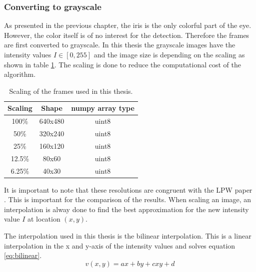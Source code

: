 \subsubsection{Converting to grayscale}
As presented in the previous chapter, the iris is the only colorful part of the eye. However, the color itself is of no interest for the detection. Therefore the frames are first converted to grayscale. 
In this thesis the grayscale images have the intensity values $I \in [0,255]$ and the image size is depending on the scaling as shown in table \ref{tab:resoluiton}. The scaling is done to reduce the computational cost of the algorithm. 

\begin{table}[h]
    \centering 
    \begin{minipage}{0.7\textwidth}
      \centering
      \begin{tabular}{|c|c|c|}
        \hline
        Scaling &  Shape & numpy array type \\
        \hline
        100\% & 640x480& uint8 \\
        50\% & 320x240 & uint8 \\
        25\% & 160x120 & uint8 \\
        12.5\% & 80x60 & uint8 \\
        6.25\% & 40x30 & uint8 \\
        \hline
      \end{tabular}
      \caption{Scaling of the frames used in this thesis.}
      \label{tab:resoluiton}
    \end{minipage}\hfill
\end{table}

It is important to note that these resolutions are congruent with the LPW paper \cite{zhang_max-planck-institut_2016}. This is important for the comparison of the results.
When scaling an image, an interpolation is alway done to find the best approximation for the new intensity value $I$ at location $(x,y)$. 

The interpolation used in this thesis is the bilinear interpolation\cite{gonzalez_bilinear_2018}. This is a linear interpolation in the x and y-axis of the intensity values and solves equation \ref{eq:bilinear}.
\begin{equation}
    v(x,y) = ax + by + cxy + d 
    \label{eq:bilinear}
\end{equation}

